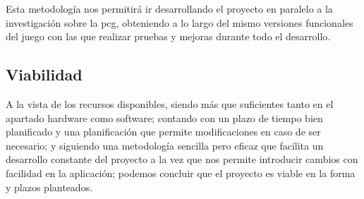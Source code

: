     Esta metodología nos permitirá ir desarrollando el proyecto en paralelo a la investigación sobre la \acrshort{pcg}, obteniendo a lo largo del mismo versiones funcionales del juego con las que realizar pruebas y mejoras durante todo el desarrollo.

\subsection{Viabilidad}

    A la vista de los recursos disponibles, siendo más que suficientes tanto en el apartado hardware como software; contando con un plazo de tiempo bien planificado y una planificación que permite modificaciones en caso de ser necesario; y siguiendo una metodología sencilla pero eficaz que facilita un desarrollo constante del proyecto a la vez que nos permite introducir cambios con facilidad en la aplicación; podemos concluir que el proyecto es viable en la forma y plazos planteados.